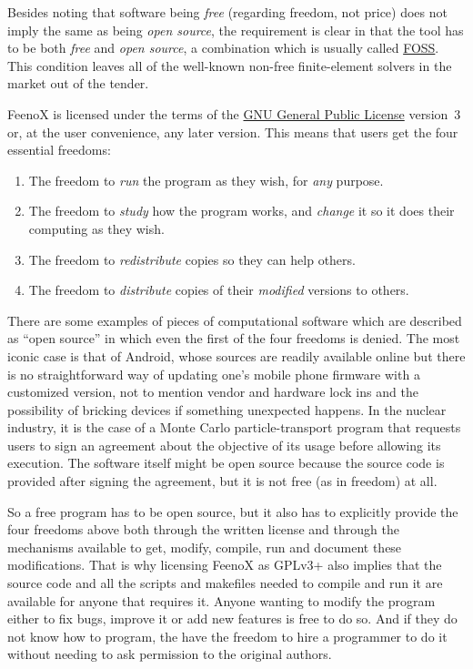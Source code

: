 \documentclass[
  american,
]{article}
\providecommand{\tightlist}{%
  \setlength{\itemsep}{0pt}\setlength{\parskip}{0pt}}
\begin{document}
Besides noting that software being \emph{free} (regarding freedom, not
price) does not imply the same as being \emph{open source}, the
requirement is clear in that the tool has to be both \emph{free} and
\emph{open source}, a combination which is usually called
\href{https://en.wikipedia.org/wiki/Free_and_open-source_software}{FOSS}.
This condition leaves all of the well-known non-free finite-element
solvers in the market out of the tender.

FeenoX is licensed under the terms of the
\href{https://www.gnu.org/licenses/gpl-3.0}{GNU General Public License}
version~3 or, at the user convenience, any later version. This means
that users get the four essential freedoms:

\begin{enumerate}
\def\labelenumi{\arabic{enumi}.}
\setcounter{enumi}{-1}
\tightlist
\item
  The freedom to \emph{run} the program as they wish, for \emph{any}
  purpose.
\item
  The freedom to \emph{study} how the program works, and \emph{change}
  it so it does their computing as they wish.
\item
  The freedom to \emph{redistribute} copies so they can help others.
\item
  The freedom to \emph{distribute} copies of their \emph{modified}
  versions to others.
\end{enumerate}

There are some examples of pieces of computational software which are
described as ``open source'' in which even the first of the four
freedoms is denied. The most iconic case is that of Android, whose
sources are readily available online but there is no straightforward way
of updating one's mobile phone firmware with a customized version, not
to mention vendor and hardware lock ins and the possibility of bricking
devices if something unexpected happens. In the nuclear industry, it is
the case of a Monte Carlo particle-transport program that requests users
to sign an agreement about the objective of its usage before allowing
its execution. The software itself might be open source because the
source code is provided after signing the agreement, but it is not free
(as in freedom) at all.

So a free program has to be open source, but it also has to explicitly
provide the four freedoms above both through the written license and
through the mechanisms available to get, modify, compile, run and
document these modifications. That is why licensing FeenoX as GPLv3+
also implies that the source code and all the scripts and makefiles
needed to compile and run it are available for anyone that requires it.
Anyone wanting to modify the program either to fix bugs, improve it or
add new features is free to do so. And if they do not know how to
program, the have the freedom to hire a programmer to do it without
needing to ask permission to the original authors.
\end{document}
